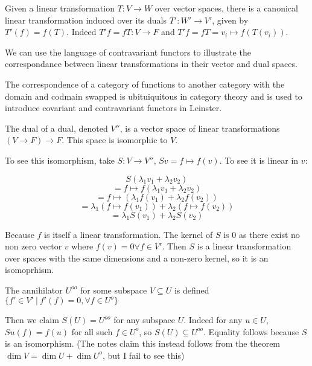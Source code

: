\documentclass[10pt]{article}
\begin{document}
Given a linear transformation $T: V \to W$ over vector spaces, there is a
canonical linear transformation induced over its duals $T': W' \to V'$,
given by $T'(f) = f(T)$. Indeed $T'f = fT: V \to F$ and $T'f = fT = v_i \mapsto
f(T(v_i))$.

\begin{note}

We can use the language of contravariant functors to illustrate the
correspondance between linear transformations in their vector and dual spaces.


The correspondence of a category of functions to another category with the
domain and codmain swapped is ubituiquitous in category theory and is used to
introduce covariant and contravariant functors in Leinster. 


\end{note}

\begin{definition}
	The dual of a dual, denoted $V''$, is a vector space of linear
	transformations $(V \to F) \to F$. This space is isomorphic to $V$.
\end{definition}

To see this isomorphism, take $S: V \to V''$, $Sv = f \mapsto f(v)$.
To see it is linear in $v$:

\[S(\lambda_1 v_1 + \lambda_2 v_2)\] 
\[= f \mapsto f(\lambda_1 v_1 + \lambda_2 v_2)\]
\[= f \mapsto (\lambda_1 f(v_1) + \lambda_2 f(v_2))\]
\[= \lambda_1 (f \mapsto f(v_1)) + \lambda_2 (f \mapsto f(v_2))\]
\[= \lambda_1 S(v_1) + \lambda_2 S(v_2)\]

Because $f$ is itself a linear transformation. The kernel of $S$ is $0$ as
there exist no non zero vector $v$ where $f(v) = 0 \forall f \in V'$. Then $S$
is a linear transformation over spaces with the same dimensions and a non-zero
kernel, so it is an isomoprhism.

\begin{definition}
	The annihilator $U^{oo}$ for some subspace $V \subseteq U$ is defined $\{ f'
	\in V' ~|~ f'(f) = 0, \forall f \in U^o \}$
\end{definition}

Then we claim $S(U) = U^{oo}$ for any subspace $U$. Indeed for any $u \in U$,
$Su(f) = f(u)$ for all such $f \in U^o$, so $S(U) \subseteq U^{oo}$.  Equality
follows because $S$ is an isomorphism. (The notes claim this instead follows
from the theorem $\dim V = \dim U + \dim U^o$, but I fail to see this)
\end{document}
